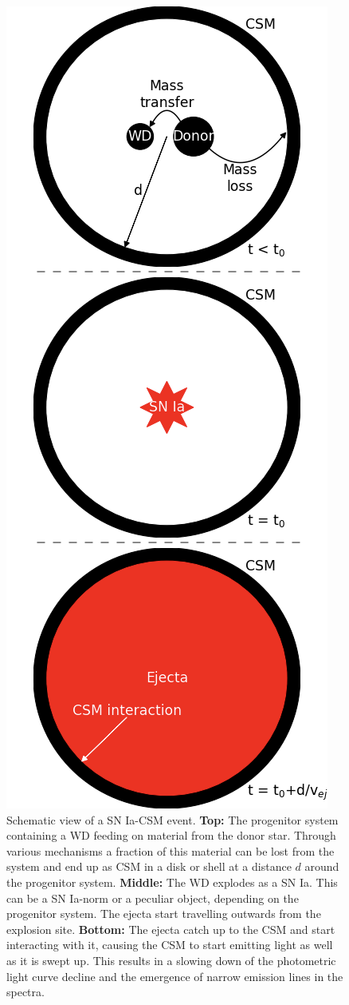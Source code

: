 \documentclass[a4paper,oneside,12pt, class=Latex/Classes/PhDthesisPSnPDF, crop=false]{standalone}
\begin{document}
\begin{figure}
    \centering
    \includegraphics[height=0.847\textheight]{../Images/chapter_1/CSM_sketch_vert.png}
    \caption{Schematic view of a SN Ia-CSM event. \textbf{Top:} The progenitor system containing a WD feeding on material from the donor star. Through various mechanisms a fraction of this material can be lost from the system and end up as CSM in a disk or shell at a distance $d$ around the progenitor system. \textbf{Middle:} The WD explodes as a SN Ia. This can be a SN Ia-norm or a peculiar object, depending on the progenitor system. The ejecta start travelling outwards from the explosion site. \textbf{Bottom:} The ejecta catch up to the CSM and start interacting with it, causing the CSM to start emitting light as well as it is swept up. This results in a slowing down of the photometric light curve decline and the emergence of narrow emission lines in the spectra.}
    \label{Ia-CSM_mod}
\end{figure}
\end{document}
